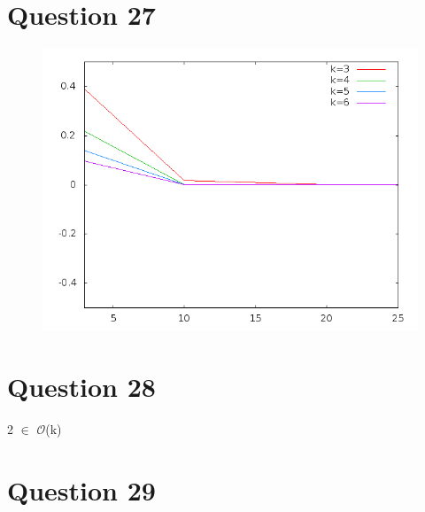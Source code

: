 \documentclass[a4paper,12pt]{report}
\begin{document}
\section*{Question 27}
\begin{figure}[!ht]
	\center
	\includegraphics[scale=0.4]{q27.png}
\end{figure}

\section*{Question 28}
2 $\in$ $\mathcal{O}$(k)

\section*{Question 29}





\newpage
\end{document}
